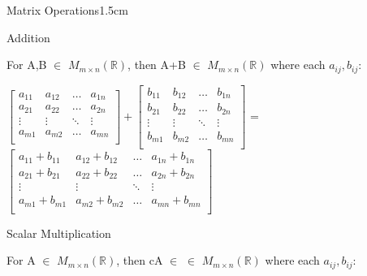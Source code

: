     \begin{ltheorem}{Matrix Operations}{1.5cm}
        \item Addition

            For A,B $\in$ $M_{m \times n}(\mathbb{R})$,
            then A+B $\in$ $M_{m \times n}(\mathbb{R})$
            where each $a_{ij},b_{ij}$:
        
            {\footnotesize
            $
            \begin{bmatrix}
                a_{11} & a_{12} & \hdots & a_{1n} \\
                a_{21} & a_{22} & \hdots & a_{2n} \\
                \vdots & \vdots & \ddots & \vdots \\
                a_{m1} & a_{m2} & \hdots & a_{mn} \\
            \end{bmatrix} +
            \begin{bmatrix}
                b_{11} & b_{12} & \hdots & b_{1n} \\
                b_{21} & b_{22} & \hdots & b_{2n} \\
                \vdots & \vdots & \ddots & \vdots \\
                b_{m1} & b_{m2} & \hdots & b_{mn} \\
            \end{bmatrix}
            $
            =
            $
            \begin{bmatrix}
                a_{11}+b_{11} & a_{12}+b_{12} & \hdots & a_{1n}+b_{1n} \\
                a_{21}+b_{21} & a_{22}+b_{22} & \hdots & a_{2n}+b_{2n} \\
                \vdots & \vdots & \ddots & \vdots \\
                a_{m1}+b_{m1} & a_{m2}+b_{m2} & \hdots & a_{mn}+b_{mn} \\
            \end{bmatrix}
            $}

        \item Scalar Multiplication
            
            For A $\in$ $M_{m \times n}(\mathbb{R})$,
            then cA $\in$ $\in$ $M_{m \times n}(\mathbb{R})$
            where each $a_{ij},b_{ij}$:


\end{ltheorem}
